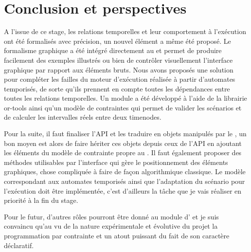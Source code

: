 \chapter{Conclusion et perspectives}

A l'issue de ce stage, les relations temporelles et leur comportement à l'exécution ont été formalisés avec précision, un nouvel élément a même été proposé.
%
Le formalisme graphique a été intégré directement au \csp{} et permet de produire facilement des exemples illustrés ou bien de contrôler visuellement l'interface graphique par rapport aux éléments bruts.
%
Nous avons proposés une solution pour compléter les failles du moteur d'exécution réalisée à partir d'automates temporisés, de sorte qu'ils prennent en compte toutes les dépendances entre toutes les relations temporelles.
Un module \csp{} a été développé à l'aide de la librairie or-tools ainsi qu'un modèle de contraintes qui permet de valider les scénarios et de calculer les intervalles réels entre deux timenodes.

Pour la suite, il faut finaliser l'API \ossia{} et les traduire en objets manipulés par le \csp{}, un bon moyen est alors de faire hériter ces objets depuis ceux de l'API en ajoutant les éléments du modèle de contrainte propre au \csp{}.
%
Il faut également proposer des méthodes utilisables par l'interface qui gère le positionnement des éléments graphiques, chose compliquée à faire de façon algorithmique classique.
%
Le modèle correspondant aux automates temporisés ainsi que l'adaptation du scénario pour l'exécution doit être implémentée, c'est d'ailleurs la tâche que je vais réaliser en priorité à la fin du stage.

Pour le futur, d'autres rôles pourront être donné au module \csp{} d'\iscore{} et je suis convaincu qu'au vu de la nature expérimentale et évolutive du projet la programmation par contrainte et un atout puissant du fait de son caractère déclaratif.